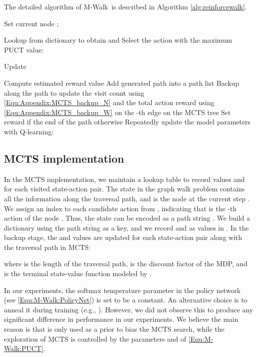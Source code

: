 \documentclass{article}
\newcommand{\modelname}{M-Walk}
\begin{document}
The detailed algorithm of \modelname~is described in Algorithm \ref{alg:reinforcewalk}. 
\begin{algorithm}[h]
	\begin{algorithmic}[1]
		\STATE Set current node ; \;
		\FOR{}


		\STATE Lookup from dictionary to obtain  and  \;
		\STATE Select the action  with the maximum PUCT value:
		
		\STATE Update \;


		\STATE Compute estimated reward value  \;
		\STATE Add generated path  into a path list \;
		\STATE Backup along the path  to update the visit count  using \eqref{Equ:Appendix:MCTS_backup_N} and the total action reward  using \eqref{Equ:Appendix:MCTS_backup_W} on the -th edge on the MCTS tree \;
\ENDIF
		\ENDFOR
		\ENDFOR
		\STATE Set reward  if the end of the path  otherwise \;
		\STATE Repeatedly update the model parameters with Q-learning:
		
	\ENDFOR	
	\caption{\modelname~Training Algorithm}
	\label{alg:reinforcewalk}
	\end{algorithmic}
\end{algorithm}

\subsection{MCTS implementation}
\label{Appendix:AlgDetails:MCTS}
In the MCTS implementation, we maintain a lookup table to record values  and  for each visited state-action pair. The state  in the graph walk problem contains all the information along the traversal path, and  is the node at the current step .
We assign an index  to each candidate action  from , indicating that  is the -th action of the node . 
Thus, the state  can be encoded as a path string .
We build a dictionary  using the path string as a key, and we record  and  as values in . In the backup stage, the  and  values are updated for each state-action pair along with the traversal path in MCTS:

where  is the length of the traversal path,  is the discount factor of the MDP, and  is the terminal state-value function modeled by .

In our experiments, the softmax temperature parameter  in the policy network  (see \eqref{Equ:\modelname:PolicyNet}) is set to be a constant. An alternative choice is to anneal it during training (e.g., ). However, we did not observe this to produce any significant difference in performance in our experiments. We believe the main reason is that  is only used as a prior to bias the MCTS search, while the exploration of MCTS is controlled by the parameters  and  of \eqref{Equ:\modelname:PUCT}.
\end{document}
